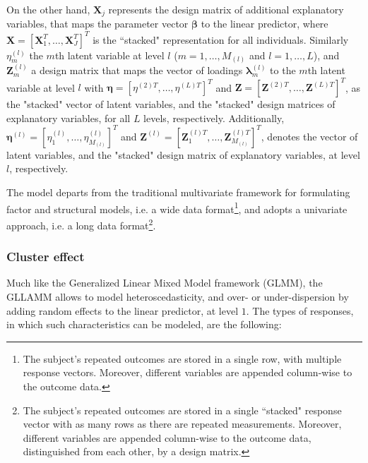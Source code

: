 On the other hand, $\mathbf{X}_{j}$ represents  the design matrix of additional explanatory variables, that maps the parameter vector $\pmb{\beta}$ to the linear predictor, where $\mathbf{X} = \left[ \mathbf{X}_{1}^{T}, \dots, \mathbf{X}_{J}^{T} \right]^{T}$ is the  ``stacked" representation for all individuals. Similarly $\eta_{m}^{(l)}$ the $m$th latent variable at level $l$ ($m=1, \dots, M_{(l)}$ and $l=1, \dots, L$), and $\mathbf{Z}_{m}^{(l)}$ a design matrix that maps the vector of loadings $\pmb{\lambda}_{m}^{(l)}$ to the $m$th latent variable at level $l$ with $\pmb{\eta}=\left[\eta^{(2)T}, \dots, \eta^{(L)T}\right]^{T}$ and $\mathbf{Z}=\left[\mathbf{Z}^{(2)T}, \dots, \mathbf{Z}^{(L)T}\right]^{T}$, as the "stacked" vector of latent variables, and the "stacked" design matrices of explanatory variables, for all $L$ levels, respectively. Additionally, $\pmb{\eta}^{(l)}=\left[\eta_{1}^{(l)}, \dots, \eta_{M_{(l)}}^{(l)}\right]^{T}$ and $\mathbf{Z}^{(l)}=\left[\mathbf{Z}_{1}^{(l)T}, \dots, \mathbf{Z}_{M_{(l)}}^{(l)T}\right]^{T}$, denotes the vector of latent variables, and the "stacked" design matrix of explanatory variables, at level $l$, respectively.



The model departs from the traditional multivariate framework for formulating factor and structural models, i.e. a wide data format\footnote{ The subject’s repeated outcomes are stored in a single row, with multiple response vectors. Moreover, different variables are appended column-wise to the outcome data. }, and adopts a univariate approach, i.e. a long data format\footnote{ The subject’s repeated outcomes are stored in a single ``stacked" response vector with as many rows as there are repeated measurements. Moreover, different variables are appended column-wise to the outcome data, distinguished from each other, by a design matrix. }. 





\subsubsection{Cluster effect} \label{ss_sect:clusters}

Much like the Generalized Linear Mixed Model framework (GLMM), the GLLAMM allows to model heteroscedasticity, and over- or under-dispersion by adding random effects to the linear predictor, at level $1$. The types of responses, in which such characteristics can be modeled, are the following:
	
